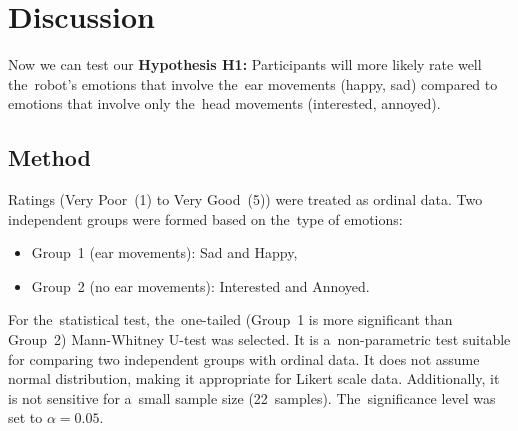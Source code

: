 \section{Discussion} %

\par Now we can test our \textbf{Hypothesis H1:} Participants will more likely rate well the~robot's emotions that involve the~ear movements (happy, sad) compared to emotions that involve only the~head movements (interested, annoyed).

\subsection{Method}

\par Ratings (Very Poor~(1) to Very Good~(5)) were treated as ordinal data. Two independent groups were formed based on the~type of emotions:
\begin{itemize}
  \item Group~1 (ear movements): Sad and Happy,
  \item Group~2 (no ear movements): Interested and Annoyed.
\end{itemize}
For the~statistical test, the~one-tailed (Group~1 is more significant than Group~2) Mann-Whitney U-test was selected. It is a~non-parametric test suitable for comparing two independent groups with ordinal data. It does not assume normal distribution, making it appropriate for Likert scale data. Additionally, it is not sensitive for a~small sample size (22~samples). The~significance level was set to $\alpha = 0.05$.

